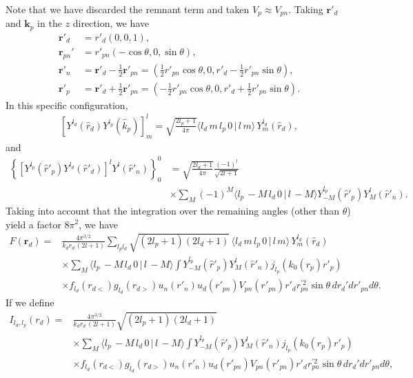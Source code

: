 \documentclass[a4paper,11pt]{article}
\begin{document}
Note that we have discarded the remnant term and taken $V_{p}\approx V_{pn}$.
Taking $\mathbf r'_d$ and $\mathbf k_p$ in the $z$ direction, we have
\begin{align}\label{eq43}
\nonumber\mathbf r'_d&=r'_d\left(0,0,1\right),\\
\nonumber\mathbf r_{pn}'&=r'_{pn}\left(-\cos\theta,0,\sin\theta\right),\\
\nonumber \mathbf r'_{n}&=\mathbf r'_d-\frac{1}{2}\mathbf r'_{pn}=\left(\frac{1}{2}r'_{pn}\cos\theta,0,r'_d-\frac{1}{2}r'_{pn}\sin\theta\right),\\
 \mathbf r'_{p}&=\mathbf r'_d+\frac{1}{2}\mathbf r'_{pn}=\left(-\frac{1}{2}r'_{pn}\cos\theta,0,r'_d+\frac{1}{2}r'_{pn}\sin\theta\right).
\end{align}
In this specific configuration,
 \begin{align}\label{eq72}
\left[Y^{l_d}(\hat r_d) Y^{l_p}(\hat k_p)\right]^l_m=\sqrt{\frac{2l_p+1}{4\pi}}\langle l_d\,m\,l_p\,0\,|\,l\,m\rangle \,Y^{l_d}_m(\hat r_d),
 \end{align}
 and
  \begin{align}\label{eq73}
  \nonumber \left\{\left[Y^{l_p}(\hat r'_p)Y^{l_d}(\hat r'_d)\right]^lY^l(\hat r'_n)\right\}^0_0&=\sqrt{\frac{2l_d+1}{4\pi}}\frac{(-1)^{l}}{\sqrt{2l+1}}\\
  &\times\sum_{M}(-1)^M\langle l_p\,-M\,l_d\,0\,|\,l\,-M\rangle    Y^{l_p}_{-M}(\hat r'_p)Y^{l}_{M}(\hat r'_n).
  \end{align}
  Taking into account that the integration over the remaining angles (other than $\theta$) yield a factor $8\pi^2$, we have
 \begin{align}\label{eq74}
 \nonumber F(\mathbf r_d)=&\frac{4\pi^{3/2}}{k_dr_d\,(2l+1)}\sum_{l_pl_d}\sqrt{(2l_p+1)(2l_d+1)}\,\langle l_d\,m\,l_p\,0\,|\,l\,m\rangle\,Y^{l_d}_m(\hat r_d)\\
 \nonumber&\times\sum_{M}\langle l_p\,-M\,l_d\,0\,|\,l\,-M\rangle  \int  Y^{l_p}_{-M}(\hat r'_p)Y^{l}_{M}(\hat r'_n)j_{l_p}(k_0(r_p) r'_p)\\
 &\times f_{l_d}(r_{d<})g_{l_d}(r_{d>})u_n(r'_n)u_d(r'_{pn}) V_{pn}(r'_{pn}) r'_dr_{pn}^{'2}\sin\theta\, d r_d'dr'_{pn}d\theta.
 \end{align}
 If we define
 \begin{align}\label{eq48}
\nonumber I_{l_d,l_p}(r_d)=&\frac{4\pi^{3/2}}{k_dr_d\,(2l+1)}\sqrt{(2l_p+1)(2l_d+1)}\\
\nonumber&\times\sum_{M}\langle l_p\,-M\,l_d\,0\,|\,l\,-M\rangle  \int  Y^{l_p}_{-M}(\hat r'_p)Y^{l}_{M}(\hat r'_n)j_{l_p}(k_0(r_p) r'_p)\\
&\times f_{l_d}(r_{d<})g_{l_d}(r_{d>})u_n(r'_n)u_d(r'_{pn}) V_{pn}(r'_{pn}) r'_dr_{pn}^{'2}\sin\theta\, d r_d'dr'_{pn}d\theta,
 \end{align}
\end{document}
